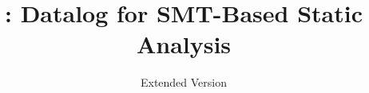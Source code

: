 \documentclass[acmsmall,screen,nonacm]{acmart}
\theoremstyle{definition}
\begin{document}
\newcommand{\tosmt}{\ensuremath{\mathrm{toSMT}}}
\newcommand{\erase}{\ensuremath{\mathrm{erase}}}

\newcommand{\world}{\ensuremath{\mathcal{W}}}
\newcommand{\apply}[2]{\ensuremath{\mathrm{apply}(#1, #2)}}
\newcommand{\unify}{\ensuremath{\sim}}
\newcommand{\Unify}{\ensuremath{\sim}}
\newcommand{\length}{\ensuremath{\mathrm{length}}}
\newcommand{\stepsto}{\ensuremath{\rightarrow}}
\newcommand{\StepstoE}{\ensuremath{\Downarrow_e}}
\newcommand{\StepstoVecE}{\ensuremath{\Downarrow_{\vec{e}}}}
\newcommand{\StepstoPhi}{\ensuremath{\Downarrow_\phi}}
\newcommand{\StepstoVecPhi}{\ensuremath{\Downarrow_{\vec{\phi}}}}
\newcommand{\lookup}{\ensuremath{\mathrm{lookup}}}
\newcommand{\isgrnd}{\ensuremath{\mathrm{isGround}}}
\newcommand{\vars}{\ensuremath{\mathrm{vars}}}
\newcommand{\true}{\ensuremath{\mathrm{true}}}
\newcommand{\false}{\ensuremath{\mathrm{false}}}
\newcommand{\cSMT}[1]{\ensuremath{c^\mathsf{SMT}_{\mathsf{#1}}}}
\newcommand{\cCONST}{\ensuremath{\cSMT{const}}}
\newcommand{\cVAR}{\ensuremath{\cSMT{var}}}
\newcommand{\cCTOR}{\ensuremath{\cSMT{ctor}}}
\newcommand{\cUF}{\ensuremath{\cSMT{uf}}}
\newcommand{\cLET}{\ensuremath{\cSMT{let}}}
\newcommand{\cFORALL}{\ensuremath{\cSMT{forall}}}
\newcommand{\grayb}[1]{\implicit{[}{#1}\implicit{]}}
\newcommand{\operation}[1]{\ensuremath{\mathord{\otimes}({#1})}}

\newcommand{\sig}{\ensuremath{\mathrm{sig}}}
\newcommand{\inst}{\ensuremath{\mathrm{inst}}}

\lstset{
    basicstyle=\small\ttfamily,
    mathescape=true
}

\title{\Name: Datalog for SMT-Based Static Analysis}
\iffull
\subtitle{Extended Version}                     %
\fi       %
\end{document}
